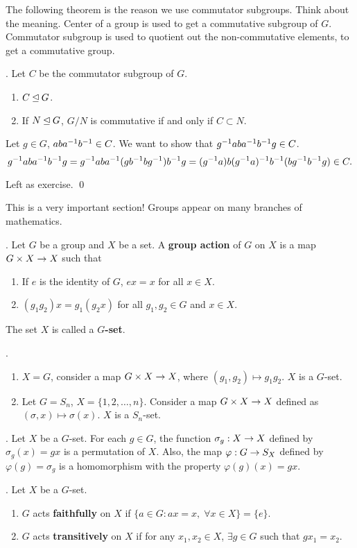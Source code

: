 The following theorem is the reason we use commutator subgroups. Think about the meaning. Center of a group is used to get a commutative subgroup of \(G\). Commutator subgroup is used to quotient out the non-commutative elements, to get a commutative group.

\thm. Let \(C\) be the commutator subgroup of \(G\).
\begin{enumerate}
    \item \(C \unlhd G\).
    \item If \(N \unlhd G\), \(G/N\) is commutative if and only if \(C \subset N\).
\end{enumerate}

\pf {} Let \(g \in G\), \(aba^{-1} b^{-1} \in C\). We want to show that \(g^{-1} aba^{-1} b^{-1} g \in C\).
\[
    g^{-1} aba^{-1} b^{-1} g = g^{-1} aba^{-1} (gb^{-1} b g^{-1})b^{-1} g = (g^{-1} a)b(g^{-1} a)^{-1} b^{-1} (bg^{-1} b^{-1} g) \in C.
\]

 Left as exercise. \qed


This is a very important section! Groups appear on many branches of mathematics.

.  Let \(G\) be a group and \(X\) be a set. A \textbf{group action} of \(G\) on \(X\) is a map \(G \times X \rightarrow X\) such that
\begin{enumerate}
    \item If \(e\) is the identity of \(G\), \(ex = x\) for all \(x \in X\).
    \item \((g_1g_2)x = g_1(g_2 x)\) for all \(g_1, g_2 \in G\) and \(x \in X\).
\end{enumerate}
The set \(X\) is called a \textbf{\(G\)-set}.

\ex.
\begin{enumerate}
    \item \(X = G\), consider a map \(G \times X \rightarrow X\), where \((g_1, g_2) \mapsto g_1 g_2\). \(X\) is a \(G\)-set.
    \item Let \(G = S_n\), \(X = \{1, 2, \dots, n\}\). Consider a map \(G \times X \rightarrow X\) defined as \((\sigma, x) \mapsto \sigma(x)\). \(X\) is a \(S_n\)-set.
\end{enumerate}

\thm. Let \(X\) be a \(G\)-set. For each \(g \in G\), the function \(\sigma_g: X \rightarrow X\) defined by \(\sigma_g(x) = gx\) is a permutation of \(X\). Also, the map \(\varphi : G \rightarrow S_X\) defined by \(\varphi(g) = \sigma_g\) is a homomorphism with the property \(\varphi(g)(x) = gx\).

. Let \(X\) be a \(G\)-set.
\begin{enumerate}
    \item \(G\) acts \textbf{faithfully} on \(X\) if \(\{a \in G : ax = x, \; \forall x \in X\} = \{e\}\).
    \item \(G\) acts \textbf{transitively} on \(X\) if for any \(x_1, x_2 \in X\), \(\exists g \in G\) such that \(g x_1 = x_2\).
\end{enumerate}

\pagebreak
